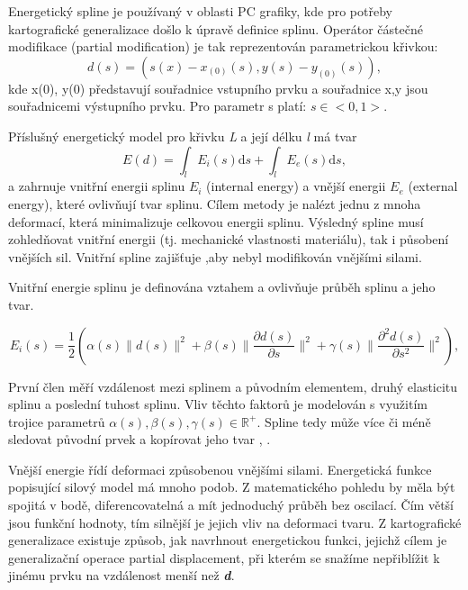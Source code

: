 \documentclass[oneside,12pt,a4paper]{book}
\begin{document}
Energetický spline je používaný v oblasti PC grafiky, kde pro potřeby kartografické generalizace došlo k úpravě definice splinu. Operátor částečné modifikace (partial modification) je tak reprezentován parametrickou křivkou:
\begin{equation}
    d(s)=(s(x)-x_{(0)}(s), y(s)-y_{(0)}(s)),
\end{equation}
kde x(0), y(0) představují souřadnice vstupního prvku a souřadnice x,y jsou souřadnicemi výstupního prvku. Pro parametr s platí: $s \in <0,1>$.\par
Příslušný energetický model pro křivku  \emph{L} a její délku \emph{l} má tvar
\begin{equation}
    E(d)=\int_{l}E_i(s)\mathrm{d}s + \int_{l}E_e(s)\mathrm{d}s,
\end{equation}
a zahrnuje vnitřní energii splinu $E_i$ (internal energy) a vnější energii $E_e$ (external energy), které
ovlivňují tvar splinu. Cílem metody je nalézt jednu z mnoha deformací, která minimalizuje celkovou energii splinu. Výsledný spline musí zohledňovat vnitřní energii (tj. mechanické vlastnosti materiálu), tak i působení vnějších sil. Vnitřní spline zajišťuje ,aby  nebyl modifikován vnějšími silami.

Vnitřní energie splinu je definována vztahem \cite{bader2001energy} a ovlivňuje průběh splinu a jeho tvar.

\begin{equation}
    E_i(s) = \frac{1}{2} \left( \alpha(s)\| d(s)\|^2 + \beta(s) \| \frac{\partial{d}(s)}{\partial{s}}\|^2 + \gamma(s) \| \frac{\partial^2d(s)}{\partial s^2}\|^2 \right),
\end{equation}

První člen měří vzdálenost mezi splinem a původním elementem, druhý elasticitu splinu a poslední tuhost splinu. 
Vliv těchto faktorů je modelován s využitím trojice parametrů 
$\alpha(s),\beta(s),\gamma(s)\in\mathbb{R^+} $. 
Spline tedy může více či méně sledovat původní prvek a kopírovat jeho tvar \cite{kass1988snakes}, \cite{burghardt1997cartographic}.\par

Vnější energie řídí deformaci způsobenou vnějšími silami.  Energetická funkce popisující silový model má mnoho podob. Z matematického pohledu by měla být spojitá v bodě, diferencovatelná a mít jednoduchý průběh bez oscilací. Čím větší jsou funkční hodnoty, tím silnější je jejich vliv na deformaci tvaru. Z kartografické generalizace existuje způsob, jak navrhnout energetickou funkci, jejichž cílem je generalizační operace partial displacement, při kterém se snažíme nepřiblížit k jinému prvku na vzdálenost menší než \textbf{\emph{d}}.
\end{document}

